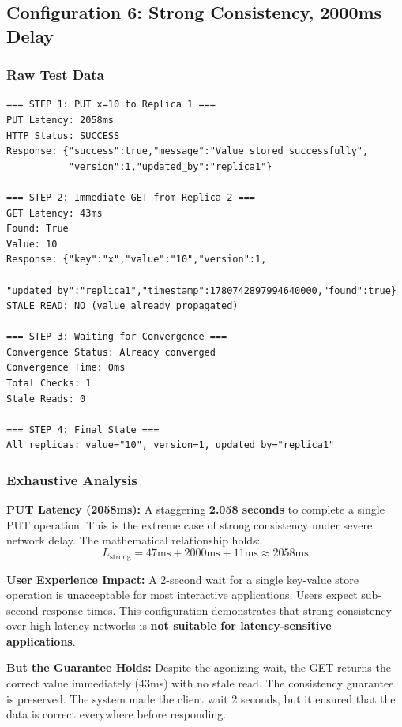 \documentclass[10pt,a4paper]{article}
\begin{document}
\subsection{Configuration 6: Strong Consistency, 2000ms Delay}

\subsubsection{Raw Test Data}

\begin{verbatim}
=== STEP 1: PUT x=10 to Replica 1 ===
PUT Latency: 2058ms
HTTP Status: SUCCESS
Response: {"success":true,"message":"Value stored successfully",
           "version":1,"updated_by":"replica1"}

=== STEP 2: Immediate GET from Replica 2 ===
GET Latency: 43ms
Found: True
Value: 10
Response: {"key":"x","value":"10","version":1,
           "updated_by":"replica1","timestamp":1780742897994640000,"found":true}
STALE READ: NO (value already propagated)

=== STEP 3: Waiting for Convergence ===
Convergence Status: Already converged
Convergence Time: 0ms
Total Checks: 1
Stale Reads: 0

=== STEP 4: Final State ===
All replicas: value="10", version=1, updated_by="replica1"
\end{verbatim}

\subsubsection{Exhaustive Analysis}

\textbf{PUT Latency (2058ms):} A staggering \textbf{2.058 seconds} to complete a single PUT operation. This is the extreme case of strong consistency under severe network delay. The mathematical relationship holds:
\begin{equation}
L_{\text{strong}} = 47\text{ms} + 2000\text{ms} + 11\text{ms} \approx 2058\text{ms}
\end{equation}

\textbf{User Experience Impact:} A 2-second wait for a single key-value store operation is unacceptable for most interactive applications. Users expect sub-second response times. This configuration demonstrates that strong consistency over high-latency networks is \textbf{not suitable for latency-sensitive applications}.

\textbf{But the Guarantee Holds:} Despite the agonizing wait, the GET returns the correct value immediately (43ms) with no stale read. The consistency guarantee is preserved. The system made the client wait 2 seconds, but it ensured that the data is correct everywhere before responding.
\end{document}
